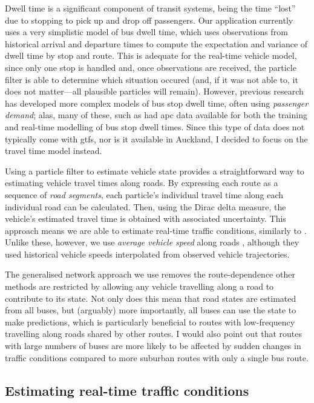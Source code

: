 Dwell time is a significant component of transit systems, being the time ``lost'' due to stopping to pick up and drop off passengers. Our application currently uses a very simplistic model of bus dwell time, which uses observations from historical arrival and departure times to compute the expectation and variance of dwell time by stop and route. This is adequate for the real-time vehicle model, since only one stop is handled and, once observations are received, the particle filter is able to determine which situation occured (and, if it was not able to, it does not matter---all plausible particles will remain). However, previous research has developed more complex models of bus stop dwell time, often using \emph{passenger demand}; alas, many of these, such as \citet{Shalaby_2004,Hans_2015} had \gls{apc} data available for both the training and real-time modelling of bus stop dwell times. Since this type of data does not typically come with \gls{gtfs}, nor is it available in Auckland, I decided to focus on the travel time model instead.


Using a particle filter to estimate vehicle state provides a straightforward way to estimating vehicle travel times along roads. By expressing each route as a sequence of \emph{road segments}, each particle's individual travel time along each individual road can be calculated. Then, using the Dirac delta measure, the vehicle's estimated travel time is obtained with associated uncertainty. This approach means we are able to estimate real-time traffic conditions, similarly to \citet{cn}. Unlike these, however, we use \emph{average vehicle speed} along roads \citep{Celan_2017,Celan_2018}, although they used historical vehicle speeds interpolated from observed vehicle trajectories.


The generalised network approach we use removes the route-dependence other methods are restricted by \citep{Yu_2010,Yin_2017,Celan_2018,Celan_2017} allowing any vehicle travelling along a road to contribute to its state. Not only does this mean that road states are estimated from all buses, but (arguably) more importantly, all buses can use the state to make predictions, which is particularly beneficial to routes with low-frequency travelling along roads shared by other routes. I would also point out that routes with large numbers of buses are more likely to be affected by sudden changes in traffic conditions compared to more suburban routes with only a single bus route.


\subsection{Estimating real-time traffic conditions}

